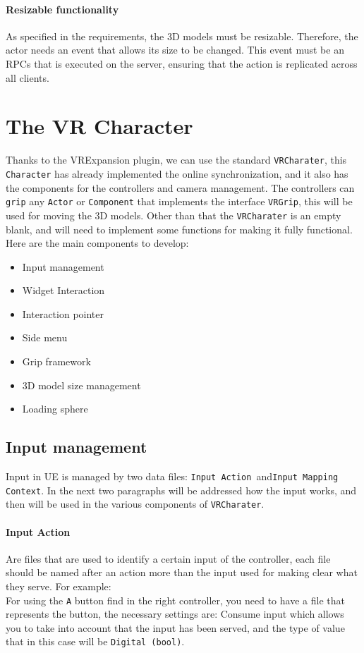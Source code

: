 \paragraph{Resizable functionality}
As specified in the requirements, the 3D models must be resizable. Therefore, the actor needs an event that allows its size to be changed. This event must be an \ac{RPCs} that is executed on the server, ensuring that the action is replicated across all clients.

\section{The VR Character}
\noindent
Thanks to the VRExpansion plugin, we can use the standard \texttt{VRCharater}, this \texttt{Character} has already implemented the online synchronization, and it also has the components for the controllers and camera management.
The controllers can \texttt{grip} any \texttt{Actor} or \texttt{Component} that implements the interface \texttt{VRGrip}, this will be used for  moving the 3D models.
Other than that the \texttt{VRCharater} is an empty blank, and will need to implement some functions for making it fully functional.\\
Here are the main components to develop:

\begin{itemize}
    \item Input management
    \item Widget Interaction
    \item Interaction pointer
    \item Side menu
    \item Grip framework
    \item 3D model size management    
    \item Loading sphere
\end{itemize}

\subsection{Input management}
\noindent
Input in \ac{UE} is managed by two data files: \texttt{Input Action }and\texttt{Input Mapping Context}.
In the next two paragraphs will be addressed how the input works, and then will be used in the various components of \texttt{VRCharater}.

\paragraph{Input Action}
Are files that are used to identify a certain input of the controller, each file should be named after an action more than the input used for making clear what they serve.
For example:\\
For using the \texttt{A} button find in the right controller,
you need to have a file that represents the button,
the necessary settings are: Consume input which allows you to take into account that the input has been served,
and the type of value that in this case will be \texttt{Digital (bool)}.

